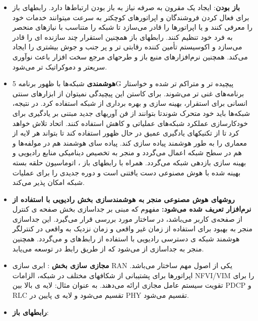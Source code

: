 \begin{itemize}
\item \textbf{باز بودن}:
ایجاد یک  مقرون به صرفه نیاز به باز بودن ارتباط‌ها دارد.
رابطهای باز برای فعال کردن فروشندگان و اپراتورهای کوچکتر به سرعت میتوانند خدمات خود را معرفی کنند و یا اپراتورها را قادر می‌سازد تا شبکه را متناسب با نیازهای منحصر به فرد خود تنظیم کنند.
رابطهای باز همچنین استقرار چند سازنده ای را قادر می‌سازد و اکوسیستم تأمین کننده رقابتی تر و پر جنب و جوش بیشتری را ایجاد می‌کند.
 همچنین نرم‌افزارهای منبع باز و طرحهای مرجع سخت افزار باعث نوآوری سریعتر و دموکراتیک تر می‌شود.
 \item \textbf{هوشمندی}
 شبکه‌ها با ظهور برنامه 5G پیچیده تر و متراکم تر شده و خواستار برنامه‌های غنی تر می‌شوند.
 برای کاستن این پیچیدگی نمیتوان از ابزارهای سنتی انسانی  برای استقرار، بهینه سازی و بهره برداری از شبکه استفاده کرد.
 در نتیجه، شبکه‌ها باید خود متحرک شوندتا بتوانند از فن آوریهای جدید مبتنی بر یادگیری برای خودکارسازی عملکرد شبکه‌های عملیاتی و کاهش  استفاده کنند.
 اتحاد  تلاش خواهد کرد تا از تکنیکهای یادگیری عمیق در حال ظهور استفاده کند تا بتواند هر لایه از معماری   را به طور هوشمند پیاده سازی کند.
 پیاده سای هوشمند هم در مولفه‌ها و هم در سطح شبکه اعمال می‌گردد و منجر به تخصیص دینامیکی منابع رادیویی و بهینه سازی بازدهی شبکه می‌گردد.
 همراه با رابطهای باز ، اتوماسیون حلقه بسته بهینه شده با هوش مصنوعی دست یافتنی است و دوره جدیدی را برای عملیات شبکه امکان پذیر می‌کند.
\item \textbf{روشهای هوش مصنوعی 
  منجر به هوشمندسازی بخش رادیویی با استفاده از نرم‌افزار تعریف شده  
  می‌شود:}
   مفهوم 
  که مبنی بر جداسازی 
   بخش صفحه ی کنترل  از
   صفحه‌ی کاربر 
می‌باشد، در ساختار 
مورد بررسی قرار می‌گیرد.
این جداسازی منجر به بهبود 
برای استفاده از زمان غیر واقعی و زمان نزدیک به واقعی در کنترلگر هوشمند شبکه ی دسترسی رادیویی   
با استفاده از رابط‌های 
و
 می‌‌گردد.
همچنین 
منجر به جداسازی 
 از 
 می‌شود
 که از طریق رابط  در  توسعه می‌یابد.
\item \textbf{مجازی سازی بخش }:
 ابری سازی RAN یکی از اصول مهم ساختار 
  می‌باشد.
 اپراتورها برای پشتیبانی از شکافهای مختلف در شبکه، الزامات NFVI/VIM را برای تقویت سیستم عامل مجازی ارائه می‌دهند.
 به عنوان مثال: لایه ی بالا بین PDCP و RLC تقسیم می‌شود و لایه ی پایین در PHY تقسیم می‌شود.
\item \textbf{رابطهای باز}:

\end{itemize}
